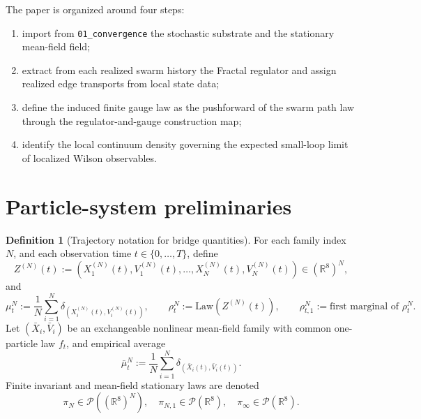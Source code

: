 \documentclass[11pt]{article}
\theoremstyle{definition}
\newtheorem{definition}[theorem]{Definition}
\theoremstyle{remark}
\newcommand{\R}{\mathbb R}
\newcommand{\Law}{\mathrm{Law}}
\newcommand{\mcP}{\mathcal P}
\begin{document}
The paper is organized around four steps:
\begin{enumerate}[leftmargin=1.5em]
\item import from \texttt{01\_convergence} the stochastic substrate and the
stationary mean-field field;
\item extract from each realized swarm history the Fractal regulator and assign
realized edge transports from local state data;
\item define the induced finite gauge law as the pushforward of the swarm path
law through the regulator-and-gauge construction map;
\item identify the local continuum density governing the expected small-loop
limit of localized Wilson observables.
\end{enumerate}

\section{Particle-system preliminaries}

\begin{definition}[Trajectory notation for bridge quantities]
\label{def:bridge-notation}
For each family index $N$, and each observation time
$t\in\{0,\dots,T\}$, define
\[
Z^{(N)}(t):=(X_1^{(N)}(t),V_1^{(N)}(t),\dots,X_N^{(N)}(t),V_N^{(N)}(t))
\in(\R^8)^N,
\]
and
\[
\mu_t^N:=\frac1N\sum_{i=1}^N\delta_{(X_i^{(N)}(t),V_i^{(N)}(t))},
\qquad
\rho_t^N:=\Law(Z^{(N)}(t)),
\qquad
\rho_{t,1}^N:=\text{first marginal of }\rho_t^N.
\]
Let \((\bar X_i,\bar V_i)\) be an exchangeable nonlinear mean-field family with
common one-particle law \(f_t\), and empirical average
\[
\bar\mu_t^N:=\frac1N\sum_{i=1}^N\delta_{(\bar X_i(t),\bar V_i(t))}.
\]
Finite invariant and mean-field stationary laws are denoted
\[
\pi_N\in\mcP((\R^8)^N),\quad
\pi_{N,1}\in\mcP(\R^8),\quad
\pi_\infty\in\mcP(\R^8).
\]
\end{definition}
\end{document}
